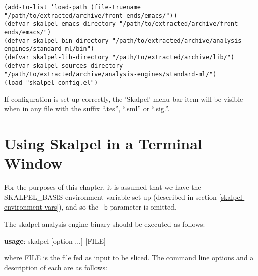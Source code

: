\documentclass{report}
\begin{document}
\noindent \texttt{(add-to-list 'load-path (file-truename "/path/to/extracted/archive/front-ends/emacs/"))}\\
\texttt{(defvar skalpel-emacs-directory "/path/to/extracted/archive/front-ends/emacs/")}\\
\texttt{(defvar skalpel-bin-directory "/path/to/extracted/archive/analysis-engines/standard-ml/bin")}\\
\texttt{(defvar skalpel-lib-directory "/path/to/extracted/archive/lib/")}\\
\texttt{(defvar skalpel-sources-directory "/path/to/extracted/archive/analysis-engines/standard-ml/")}\\
\texttt{(load "skalpel-config.el")}

If configuration is set up correctly, the 'Skalpel' menu bar item will
be visible when in any file with the suffix ``.tes'', ``.sml'' or
``.sig.''.

\chapter{Using Skalpel in a Terminal Window}
\label{command-line-arguments}

For the purposes of this chapter, it is assumed that we have the
SKALPEL\_BASIS environment variable set up (described in section
\ref{skalpel-environment-vars}), and so the \texttt{-b} parameter is
omitted.

The skalpel analysis engine binary should be executed as follows:

\noindent \textbf{usage}: skalpel [option ...] [FILE]

where FILE is the file fed as input to be sliced. The command line
options and a description of each are as follows:
\end{document}
